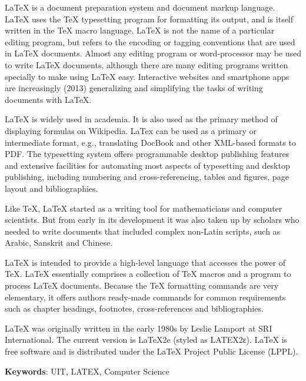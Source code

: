 LaTeX is a document preparation system and document markup language. LaTeX uses the TeX typesetting program for formatting its output, and
is itself written in the TeX macro language. LaTeX is not the name of a particular editing program, but refers to the encoding or tagging
conventions that are used in LaTeX documents. Almost any editing program or word-processor may be used to write LaTeX documents, although
there are many editing programs written specially to make using LaTeX easy. Interactive websites and smartphone apps are increasingly (2013)
generalizing and simplifying the tasks of writing documents with LaTeX.

LaTeX is widely used in academia. It is also used as the primary method of displaying formulas on Wikipedia. LaTex can be used as a
primary or intermediate format, e.g., translating DocBook and other XML-based formats to PDF. The typesetting system offers programmable
desktop publishing features and extensive facilities for automating most aspects of typesetting and desktop publishing, including numbering
and cross-referencing, tables and figures, page layout and bibliographies.

Like TeX, LaTeX started as a writing tool for mathematicians and computer scientists. But from early in its development it was also taken up
by scholars who needed to write documents that included complex non-Latin scripts, such as Arabic, Sanskrit and Chinese.

LaTeX is intended to provide a high-level language that accesses the power of TeX. LaTeX essentially comprises a collection of TeX macros
and a program to process LaTeX documents. Because the TeX formatting commands are very elementary, it offers authors ready-made commands for
common requirements such as chapter headings, footnotes, cross-references and bibliographies.

LaTeX was originally written in the early 1980s by Leslie Lamport at SRI International. The current version is LaTeX2e (styled as
LATEX2ε). LaTeX is free software and is distributed under the LaTeX Project Public License (LPPL).

{\bf{Keywords}}: UIT, LATEX, Computer Science